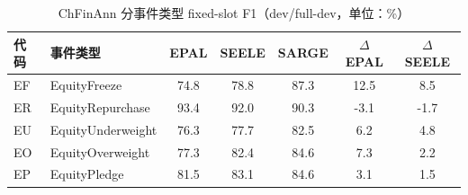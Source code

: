\begin{table}[htbp]
\centering
\caption{ChFinAnn 分事件类型 fixed-slot F1（dev/full-dev，单位：\%）}
\label{tab:chfinann-events}
\small
\begin{tabular}{llSSSSS}
\toprule
代码 & 事件类型 & {EPAL} & {SEELE} & {SARGE} & {$\Delta$EPAL} & {$\Delta$SEELE} \\
\midrule
EF & EquityFreeze & 74.8 & 78.8 & 87.3 & 12.5 & 8.5 \\
ER & EquityRepurchase & 93.4 & 92.0 & 90.3 & -3.1 & -1.7 \\
EU & EquityUnderweight & 76.3 & 77.7 & 82.5 & 6.2 & 4.8 \\
EO & EquityOverweight & 77.3 & 82.4 & 84.6 & 7.3 & 2.2 \\
EP & EquityPledge & 81.5 & 83.1 & 84.6 & 3.1 & 1.5 \\
\bottomrule
\end{tabular}
\end{table}

